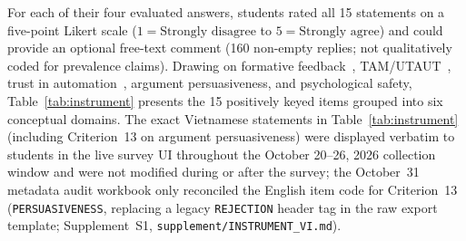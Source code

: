 \documentclass{llncs}
\begin{document}
For each of their four evaluated answers, students rated all 15 statements on a five-point Likert scale ($1 = \text{Strongly disagree}$ to $5 = \text{Strongly agree}$) and could provide an optional free-text comment (160 non-empty replies; not qualitatively coded for prevalence claims). Drawing on formative feedback~\cite{shute2008focus}, TAM/UTAUT~\cite{davis1989perceived,venkatesh2003user}, trust in automation~\cite{lee2004trust}, argument persuasiveness, and psychological safety, Table~\ref{tab:instrument} presents the 15 positively keyed items grouped into six conceptual domains. The exact Vietnamese statements in Table~\ref{tab:instrument} (including Criterion~13 on argument persuasiveness) were displayed verbatim to students in the live survey UI throughout the October 20--26, 2026 collection window and were not modified during or after the survey; the October~31 metadata audit workbook only reconciled the English item code for Criterion~13 (\texttt{PERSUASIVENESS}, replacing a legacy \texttt{REJECTION} header tag in the raw export template; Supplement~S1, \texttt{supplement/INSTRUMENT\_VI.md}).
\end{document}

